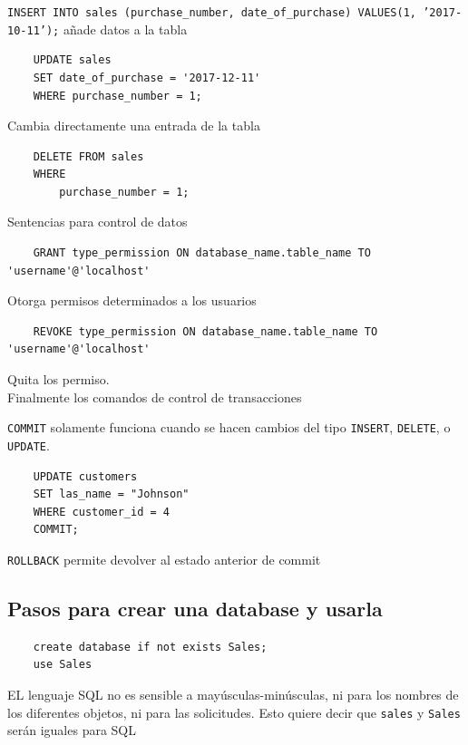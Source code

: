     \texttt{INSERT INTO sales (purchase\_number, date\_of\_purchase) VALUES(1, '2017-10-11');} añade datos a la tabla

    \begin{verbatim}
    UPDATE sales 
    SET date_of_purchase = '2017-12-11'
    WHERE purchase_number = 1;
    \end{verbatim}

    Cambia directamente una entrada de la tabla


    \begin{verbatim}
    DELETE FROM sales
    WHERE
        purchase_number = 1;
    \end{verbatim}


    Sentencias para control de datos

    \begin{verbatim}
    GRANT type_permission ON database_name.table_name TO 'username'@'localhost'
    \end{verbatim}

    Otorga permisos determinados a los usuarios


    \begin{verbatim}
    REVOKE type_permission ON database_name.table_name TO 'username'@'localhost'
    \end{verbatim}

    Quita los permiso. \\

    Finalmente los comandos de control de transacciones

    \texttt{COMMIT} solamente funciona cuando se hacen cambios del tipo \texttt{INSERT}, \texttt{DELETE}, o \texttt{UPDATE}.


    \begin{verbatim}
    UPDATE customers
    SET las_name = "Johnson"
    WHERE customer_id = 4
    COMMIT;
    \end{verbatim}


    \texttt{ROLLBACK} permite devolver al estado anterior de commit

    \subsection{Pasos para crear una database y usarla}

    \begin{verbatim}
    create database if not exists Sales; 
    use Sales
    \end{verbatim}
    EL lenguaje SQL no es sensible a mayúsculas-minúsculas, ni para los nombres de los diferentes objetos, ni para las solicitudes. Esto quiere decir que \texttt{sales} y \texttt{Sales} serán iguales para SQL

